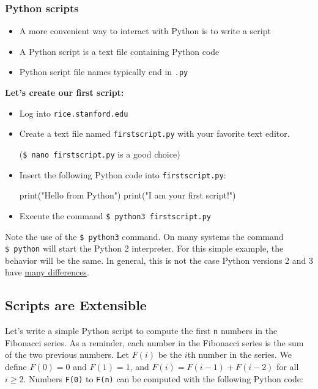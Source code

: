 \documentclass[12pt,letterpaper,twoside]{article}
\begin{document}
\subsubsection{Python scripts}

\begin{itemize}
\item
  A more convenient way to interact with Python is to write a script
\item
  A Python script is a text file containing Python code
\item
  Python script file names typically end in \texttt{.py}
\end{itemize}
\vspace{-8pt}
\textbf{Let's create our first script:}
\vspace{-8pt}
\begin{itemize}
\item
  Log into \texttt{rice.stanford.edu}
\item
  Create a text file named \texttt{firstscript.py} with your favorite
  text editor. 

  (\texttt{\$\ nano\ firstscript.py} is a good choice)
\item
  Insert the following Python code into \texttt{firstscript.py}:
  {\small
  \begin{python}
    print("Hello from Python")
    print("I am your first script!")
  \end{python}
  }
\item
  Execute the command \texttt{\$\ python3\ firstscript.py}
\end{itemize}

Note the use of the \texttt{\$\ python3} command. On many systems the
command \texttt{\$\ python} will start the Python 2 interpreter. For
this simple example, the behavior will be the same. In general, this is
not the case Python versions 2 and 3 have
\href{https://docs.python.org/3/whatsnew/3.0.html}{many differences}.

\subsection{Scripts are Extensible}
Let's write a simple Python script to compute the first \texttt{n}
numbers in the Fibonacci series. As a reminder, each number in the
Fibonacci series is the sum of the two previous numbers. Let
$F(i)$ be the $i$th number in the series. We define
$F(0) = 0$ and $F(1) = 1$, and
$F(i) = F(i-1) + F(i-2)$ for all $i \geq 2$.
Numbers \texttt{F(0)} to \texttt{F(n)} can be computed with the
following Python code:
\end{document}
